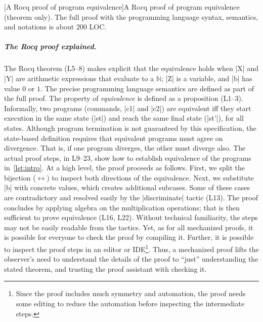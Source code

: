 \begin{center}
\captionsetup{type=lstlisting}
[A Rocq proof of program equivalence]{A Rocq proof of program equivalence (theorem only).
The full proof with the programming language syntax, semantics, and notations is about 200 LOC.}
\label{lst:eq-proof}
\end{center}

\subparagraph*{The Rocq proof explained.}
The Rocq theorem (L5--8) makes explicit that the equivalence holds when
\pr|X| and \pr|Y| are arithmetic expressions that evaluate to a \(\mathbb{N}\); \pr|Z| is a variable, and \pr|b| has value \(0\) or \(1\).
The precise programming language semantics are defined as part of the full proof.
The property of \emph{equivalence} is defined as a proposition (L1--3).
Informally, two programs (commands, \pr|c1| and \pr|c2|) are equivalent
iff they start execution in the same state (\pr|st|) and reach the same final state (\pr|st'|), for all states.
Although program termination is not guaranteed by this specification,
the state-based definition requires that equivalent programs must agree on divergence.
That is, if one program diverges, the other must diverge also.
The actual proof steps, in L9--23, show how to establish equivalence of the programs in~\autoref{lst:intro}.
At a high level, the proof proceeds as follows.
First, we split the bijection (\( \leftrightarrow \)) to inspect both directions of the equivalence.
Next, we substitute \pr|b| with concrete values, which creates additional subcases.
Some of these cases are contradictory and resolved easily by the \pr|discriminate| tactic (L13).
The proof concludes by applying algebra on the multiplication operations;
that is then sufficient to prove equivalence (L16, L22).
Without technical familiarity, the steps may not be easily readable from the tactics.
Yet, as for all mechanized proofs, it is possible for everyone to check the proof by compiling it.
Further, it is possible to inspect the proof steps in an editor or IDE\footnote{
Since the proof includes much symmetry and automation,
the proof needs some editing to reduce the automation before inspecting the intermediate steps.}.
Thus, a mechanized proof lifts the observer's need to understand the details of the proof to \enquote{just} understanding the stated theorem, and trusting the proof assistant with checking it.

